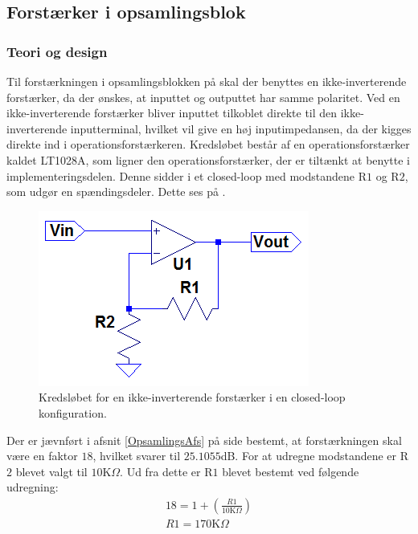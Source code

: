 \subsection{Forstærker i opsamlingsblok}\label{Subsec:Forstaerker}
\subsubsection{Teori og design}
Til forstærkningen i opsamlingsblokken på  skal der benyttes en ikke-inverterende forstærker, da der ønskes, at inputtet og outputtet har samme polaritet. Ved en ikke-inverterende forstærker bliver inputtet tilkoblet direkte til den ikke-inverterende inputterminal, hvilket vil give en høj inputimpedansen, da der kigges direkte ind i operationsforstærkeren. Kredsløbet består af en operationsforstærker kaldet LT1028A, som ligner den operationsforstærker, der er tiltænkt at benytte i implementeringsdelen. Denne sidder i et closed-loop med modstandene R$1$ og R$2$, som udgør en spændingsdeler. Dette ses på .
\begin{figure}[H]
\centering
\includegraphics[scale=0.85]{figures/cProblemloesning/Forstaerker.PNG}
\caption{Kredsløbet for en ikke-inverterende forstærker i en closed-loop konfiguration.}
\label{fig:Forstaerker}
\end{figure} 

\noindent Der er jævnført i afsnit \ref{OpsamlingsAfs} på side \pageref{OpsamlingsAfs} bestemt, at forstærkningen skal være en faktor $18$, hvilket svarer til $25.1055$dB. For at udregne modstandene er R$2$ blevet valgt til $10$K$\Omega$. Ud fra dette er R$1$ blevet bestemt ved følgende udregning:
\begin{align}
18 = 1 + (\frac{R1}{10\text{K}\Omega})\\
R1 = 170\text{K}\Omega
\end{align}

